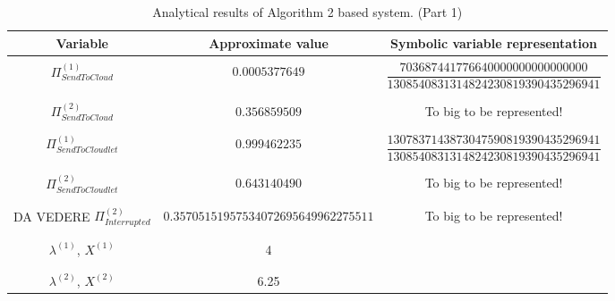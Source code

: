 \documentclass[10pt,a4paper]{article}
\begin{document}
\begin{table}[h!]
\caption{Analytical results of Algorithm 2 based system. (Part 1)}
\begin{adjustbox}{center=\textwidth}
	
     \begin{tabular}{c|c|c}
     \toprule
     \textbf{Variable} & \textbf{Approximate value} & \textbf{Symbolic variable representation} \\
     \toprule
	 
	 &&\\
	  
	 
	 $\Pi_{SendToCloud}^{(1)}$ & $0.0005377649$ & $\dfrac{703687441776640000000000000000}{1308540831314824230819390435296941}$  \\
	 
	 &&\\\hline &&\\	 
	 
	 $\Pi_{SendToCloud}^{(2)}$ & $0.356859509$ & To big to be represented! \\
	 
	 &&\\\hline &&\\
	 
	 $\Pi_{SendToCloudlet}^{(1)}$ & $0.999462235$ &  $\dfrac{1307837143873047590819390435296941}{1308540831314824230819390435296941}$  \\
	 
	 &&\\\hline &&\\
	 
	 $\Pi_{SendToCloudlet}^{(2)}$ & $0.643140490$ & To big to be represented! \\
	 
	 &&\\\hline &&\\
	 
	 DA VEDERE $\Pi_{Interrupted}^{(2)}$ & $0.35705151957534072695649962275511$ & To big to be represented! \\
	 
     &&\\\hline &&\\

	 $\lambda^{(1)}$, $X^{(1)}$ & 4 & \\
	 
	 &&\\\hline &&\\

	 $\lambda^{(2)}$, $X^{(2)}$ & 6.25 & \\
	 

\end{tabular}
\end{adjustbox}
\end{table}
\end{document}
